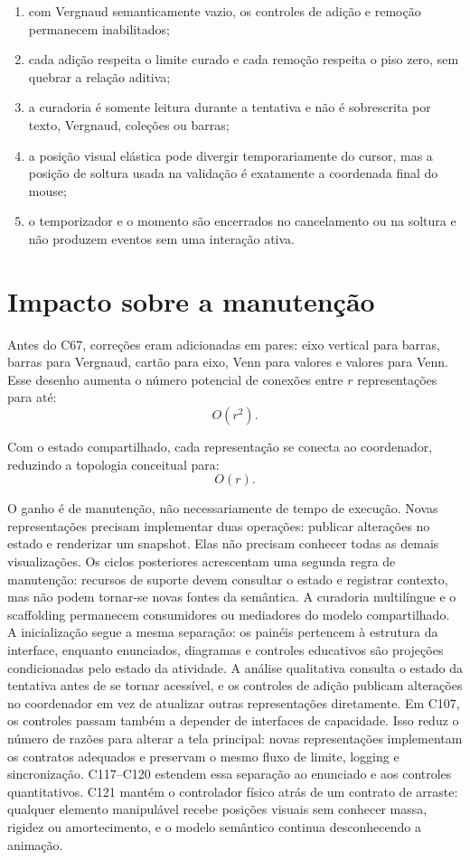 \documentclass[12pt,a4paper]{article}
\begin{document}
\begin{enumerate}[noitemsep]
  \item com Vergnaud semanticamente vazio, os controles de adição e remoção permanecem inabilitados;
  \item cada adição respeita o limite curado e cada remoção respeita o piso zero, sem quebrar a relação aditiva;
  \item a curadoria é somente leitura durante a tentativa e não é sobrescrita por texto, Vergnaud, coleções ou barras;
  \item a posição visual elástica pode divergir temporariamente do cursor, mas a posição de soltura usada na validação é exatamente a coordenada final do mouse;
  \item o temporizador e o momento são encerrados no cancelamento ou na soltura e não produzem eventos sem uma interação ativa.
\end{enumerate}

\section{Impacto sobre a manutenção}

Antes do C67, correções eram adicionadas em pares: eixo vertical para barras, barras para Vergnaud, cartão para eixo, Venn para valores e valores para Venn. Esse desenho aumenta o número potencial de conexões entre $r$ representações para até:
\[
O(r^2).
\]

Com o estado compartilhado, cada representação se conecta ao coordenador, reduzindo a topologia conceitual para:
\[
O(r).
\]

O ganho é de manutenção, não necessariamente de tempo de execução. Novas representações precisam implementar duas operações: publicar alterações no estado e renderizar um snapshot. Elas não precisam conhecer todas as demais visualizações. Os ciclos posteriores acrescentam uma segunda regra de manutenção: recursos de suporte devem consultar o estado e registrar contexto, mas não podem tornar-se novas fontes da semântica. A curadoria multilíngue e o scaffolding permanecem consumidores ou mediadores do modelo compartilhado. A inicialização segue a mesma separação: os painéis pertencem à estrutura da interface, enquanto enunciados, diagramas e controles educativos são projeções condicionadas pelo estado da atividade. A análise qualitativa consulta o estado da tentativa antes de se tornar acessível, e os controles de adição publicam alterações no coordenador em vez de atualizar outras representações diretamente. Em C107, os controles passam também a depender de interfaces de capacidade. Isso reduz o número de razões para alterar a tela principal: novas representações implementam os contratos adequados e preservam o mesmo fluxo de limite, logging e sincronização. C117--C120 estendem essa separação ao enunciado e aos controles quantitativos. C121 mantém o controlador físico atrás de um contrato de arraste: qualquer elemento manipulável recebe posições visuais sem conhecer massa, rigidez ou amortecimento, e o modelo semântico continua desconhecendo a animação.
\end{document}
